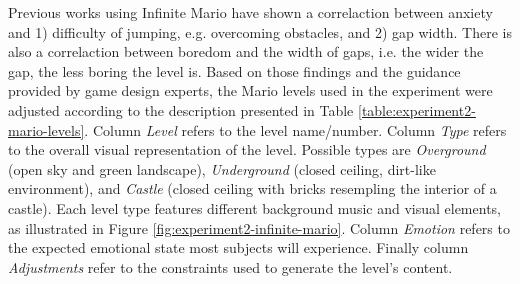 Previous works using Infinite Mario \parencite{pedersen2009modeling,pedersen2010modeling} have shown a correlaction between anxiety and 1) difficulty of jumping, e.g. overcoming obstacles, and 2) gap width. There is also a correlaction between boredom and the width of gaps, i.e. the wider the gap, the less boring the level is. Based on those findings and the guidance provided by game design experts, the Mario levels used in the experiment were adjusted according to the description presented in Table \ref{table:experiment2-mario-levels}. Column \textit{Level} refers to the level name/number. Column \textit{Type} refers to the overall visual representation of the level. Possible types are \textit{Overground} (open sky and green landscape), \textit{Underground} (closed ceiling, dirt-like environment), and \textit{Castle} (closed ceiling with bricks resempling the interior of a castle). Each level type features different background music and visual elements, as illustrated in Figure \ref{fig:experiment2-infinite-mario}. Column \textit{Emotion} refers to the expected emotional state most subjects will experience. Finally column \textit{Adjustments} refer to the constraints used to generate the level's content.

